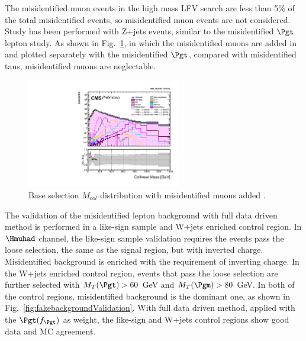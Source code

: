The misidentified muon events in the high mass LFV search are less than 5\% of the total misidentified events, so misidentified muon events are not considered. Study has been performed with Z+jets events, similar to the misidentified $\Pgt$ lepton study. As shown in Fig.~\ref{fig:MisidentifiedMuon}, in which the misidentified muons are added in and plotted separately with the misidentified $\Pgt$, compared with misidentified taus, misidentified muons are neglectable. 
 
\begin{figure}[htbp] 
\centering
\includegraphics[width=0.6\textwidth]{chapterfakerate/LFV_preselection_collMass_type1_200Fakes_PoissonErrorsMuonfake.pdf}
\caption{Base selection $M_{col}$ distribution with misidentified muons added .}
\label{fig:MisidentifiedMuon}
\end{figure}

The validation of the misidentified lepton background with full data driven method is performed in a like-sign sample and W+jets enriched control region. In $\Hmuhad$ channel, the like-sign sample validation requires the events pass the loose selection, the same as the signal region, but with inverted charge. Misidentified background is enriched with the requirement of inverting charge. In the W+jets enriched control region, events that pass the loose selection are further selected with  $M_T(\Pgt)>60$ GeV and $M_T(\Pgm)>80$ GeV.  In both of the control regions, misidentified background is the dominant one, as shown in Fig.~\ref{fig:fakebackgroundValidation}. With full data driven method, applied with the $\Pgt(f_{\Pgt})$ as weight, the like-sign and W+jets control regions show good data and MC agreement. 


